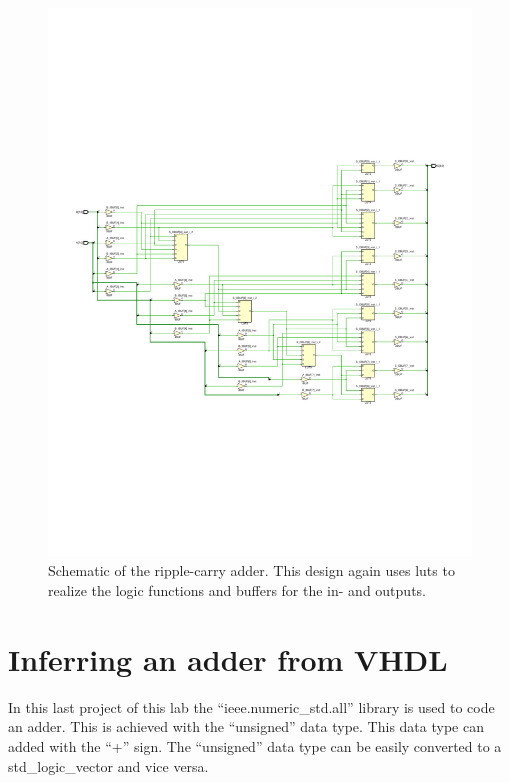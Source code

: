 \begin{figure}[h]
	\centering
	\includegraphics[width=\linewidth, trim=0mm 70mm 0mm 70mm]{./L1/E5/schematic.pdf}
	\caption{Schematic of the ripple-carry adder. This design again uses \glspl{lut} to realize the logic functions and buffers for the in- and outputs.}
	\label{fig: Ripple-carry adder schematic}
\end{figure}





\section{Inferring an adder from VHDL}

In this last project of this lab the ``ieee.numeric\_std.all'' library is used to code an adder. This is achieved with the ``unsigned'' data type. This data type can added with the ``+'' sign. The ``unsigned'' data type can be easily converted to a std\_logic\_vector and vice versa. 

